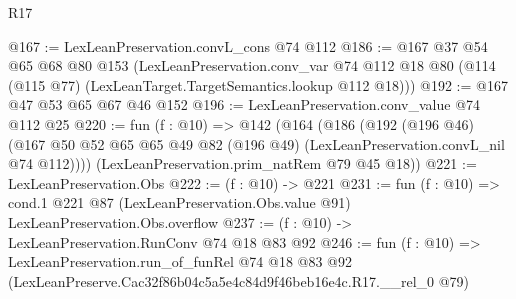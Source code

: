 \begin{lexlean}{R17}
\begin{coremodule}
@167 := LexLeanPreservation.convL_cons @74 @112
@186 := @167
    @37
    @54
    @65
    @68
    @80
    @153
    (LexLeanPreservation.conv_var
      @74
      @112
      @18
      @80
      (@114 (@115 @77) (LexLeanTarget.TargetSemantics.lookup @112 @18)))
@192 := @167 @47 @53 @65 @67 @46 @152
@196 := LexLeanPreservation.conv_value @74 @112 @25
@220 := fun (f : @10) =>
  @142
    (@164
      (@186
        (@192
          (@196 @46)
          (@167 @50 @52 @65 @65 @49 @82 (@196 @49) (LexLeanPreservation.convL_nil @74 @112))))
      (LexLeanPreservation.prim_natRem @79 @45 @18))
@221 := LexLeanPreservation.Obs
@222 := (f : @10) -> @221
@231 := fun (f : @10) =>
  cond.{1} @221 @87 (LexLeanPreservation.Obs.value @91) LexLeanPreservation.Obs.overflow
@237 := (f : @10) -> LexLeanPreservation.RunConv @74 @18 @83 @92
@246 := fun (f : @10) =>
  LexLeanPreservation.run_of_funRel
    @74
    @18
    @83
    @92
    (LexLeanPreserve.Cac32f86b04c5a5e4c84d9f46beb16e4c.R17.__rel_0 @79)
\end{coremodule}
\end{lexlean}
